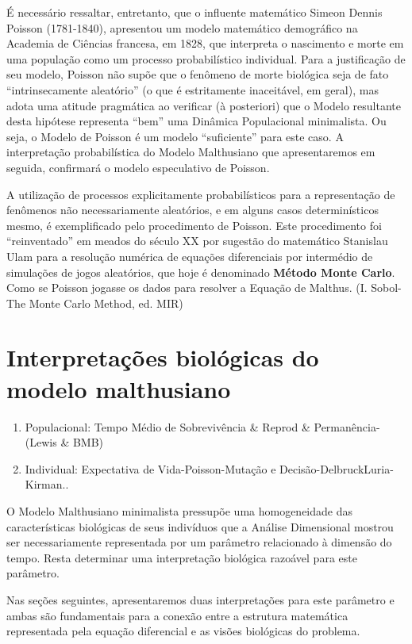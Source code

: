     É necessário ressaltar, entretanto, que o influente matemático Simeon Dennis Poisson (1781-1840), apresentou um modelo matemático demográfico na Academia de Ciências francesa, em 1828, que interpreta o nascimento e morte em uma população como um processo probabilístico individual. Para a justificação de seu modelo, Poisson não supõe que o fenômeno de morte biológica seja de fato ``intrinsecamente aleatório'' (o que é estritamente inaceitável, em geral), mas adota uma atitude pragmática ao verificar (à posteriori) que o Modelo resultante desta hipótese representa ``bem'' uma Dinâmica Populacional minimalista. Ou seja, o Modelo de Poisson é um modelo ``suficiente'' para este caso. A interpretação probabilística do Modelo Malthusiano que apresentaremos em seguida, confirmará o modelo especulativo de Poisson.

    A utilização de processos explicitamente probabilísticos para a representação de fenômenos não necessariamente aleatórios, e em alguns casos determinísticos mesmo, é exemplificado pelo procedimento de Poisson. Este procedimento foi ``reinventado'' em meados do século XX por sugestão do matemático Stanislau Ulam para a resolução numérica de equações diferenciais por intermédio de simulações de jogos aleatórios, que hoje é denominado \textbf{Método Monte Carlo}. Como se Poisson jogasse os dados para resolver a Equação de Malthus. (I. Sobol-The Monte Carlo Method, ed. MIR)

\chapter{Interpretações biológicas do modelo malthusiano}
\addt

\begin{enumerate}
\item Populacional: Tempo Médio de Sobrevivência \& Reprod \& Permanência-(Lewis \& BMB)
\item Individual: Expectativa de Vida-Poisson-Mutação e Decisão-DelbruckLuria-Kirman..
\end{enumerate}

    O Modelo Malthusiano minimalista pressupõe uma homogeneidade das características biológicas de seus indivíduos que a Análise Dimensional mostrou ser necessariamente representada por um parâmetro relacionado à dimensão do tempo. Resta determinar uma interpretação biológica razoável para este parâmetro.
    
    Nas seções seguintes, apresentaremos duas interpretações para este parâmetro e ambas são fundamentais para a conexão entre a estrutura matemática representada pela equação diferencial e as visões biológicas do problema.

